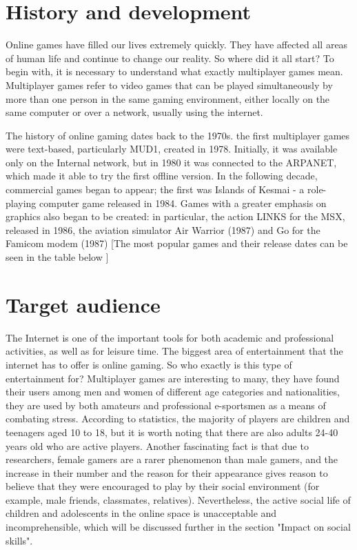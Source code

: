 \documentclass[10pt,twoside,slovak,a4paper]{article}
\begin{document}
\section{History and development} 
 Online games have filled our lives extremely quickly. They have affected all areas of human life and continue to change our reality. So where did it all start? To begin with, it is necessary to understand what exactly multiplayer games mean. Multiplayer games refer to video games that can be played simultaneously by more than one person in the same gaming environment, either locally on the same computer or over a network, usually using the internet.

 The history of online gaming dates back to the 1970s. the first multiplayer games were text-based, particularly MUD1, created in 1978. Initially, it was available only on the Internal network, but in 1980 it was connected to the ARPANET, which made it able to try the first offline version. In the following decade, commercial games began to appear; the first was Islands of Kesmai - a role-playing computer game released in 1984. Games with a greater emphasis on graphics also began to be created: in particular, the action LINKS for the MSX, released in 1986, the aviation simulator Air Warrior (1987) and Go for the Famicom modem (1987) [The most popular games and their release dates can be seen in the table below ]



\section{Target audience}
  The Internet is one of the important tools for both academic and professional activities, as well as for leisure time. The biggest area of entertainment that the internet has to offer is online gaming. So who exactly is this type of entertainment for? Multiplayer games are interesting to many, they have found their users among men and women of different age categories and nationalities, they are used by both amateurs and professional e-sportsmen as a means of combating stress. According to statistics, the majority of players are children and teenagers aged 10 to 18, but it is worth noting that there are also adults 24-40 years old who are active players. Another fascinating fact is that due to researchers, female gamers are a rarer phenomenon than male gamers, and the increase in their number and the reason for their appearance gives reason to believe that they were encouraged to play by their social environment (for example, male friends, classmates, relatives). Nevertheless, the active social life of children and adolescents in the online space is unacceptable and incomprehensible, which will be discussed further in the section "Impact on social skills".
\end{document}
